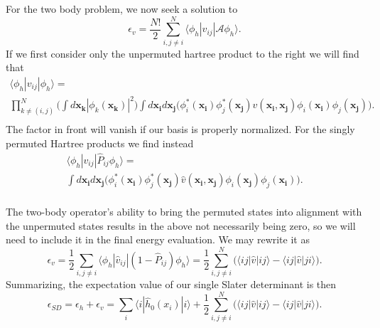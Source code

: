 For the two body problem, we now seek a solution to
\begin{equation}
\epsilon_v = \frac{N!}{2}\sum _{i,j\neq i}^N \langle \phi_h | v_{ij} | \mathcal{A}\phi_h \rangle.
 \label{eqn:two_body_inner}
\end{equation}
If we first consider only the unpermuted hartree product to the right we will find that
\begin{multline}\label{two_body_integral_2}
  \langle \phi _h | v_{ij} | \phi _h \rangle = \\
  \prod _{k\neq (i,j)}^N \Big( \int d\mathbf{x_k}|\phi _k(\mathbf{x_k})|^2 \Big) 
  \int d\mathbf{x_i}d\mathbf{x_j} \Big( \phi _i^{*}(\mathbf{x_i})\phi _j^{*}(\mathbf{x_j}) \hat{v} (\mathbf{x_i},\mathbf{x_j}) \phi _i(\mathbf{x_i})\phi _j(\mathbf{x_j}) \Big). \\ 
\end{multline}
The factor in front will vanish if our basis is properly normalized. For the singly permuted Hartree products we find instead
\begin{multline}\label{two_body_integral_permut}
  \langle \phi _h | v_{ij} | \hat{P} _{ij} \phi _h \rangle = \\ 
  \int d\mathbf{x_i}d\mathbf{x_j} \Big( \phi _i^{*}(\mathbf{x_i})\phi _j^{*}(\mathbf{x_j}) \hat{v} (\mathbf{x_i},\mathbf{x_j})\phi _i(\mathbf{x_j})\phi _j(\mathbf{x_i}) \Big). \\
\end{multline}

The two-body operator's ability to bring the permuted states into alignment with the unpermuted states results in the above not necessarily being zero, so we will need to include it in the final energy evaluation. We may rewrite it as
\begin{equation}
 \epsilon _v = \frac{1}{2}\sum _{i,j\neq i} \langle \phi _h | \hat{v}_{ij} |(1 - \hat{P} _{ij})\phi _h\rangle = \frac{1}{2}\sum _{i,j\neq i}^N \Big( \langle ij | \hat{v} | ij \rangle  - \langle ij | \hat{v} | ji \rangle \Big).
 \label{two_body_en_eq}
\end{equation}
Summarizing, the expectation value of our single Slater determinant is then
\begin{equation}
\epsilon_{SD} = \epsilon _h + \epsilon _v = \sum _i \langle i | \hat{h}_0(x_i) | i \rangle + \frac{1}{2}\sum _{i,j\neq i}^N \Big( \langle ij | \hat{v} | ij \rangle  - \langle ij | \hat{v} | ji \rangle \Big).
\label{eqn:many_body_energy}
\end{equation}




